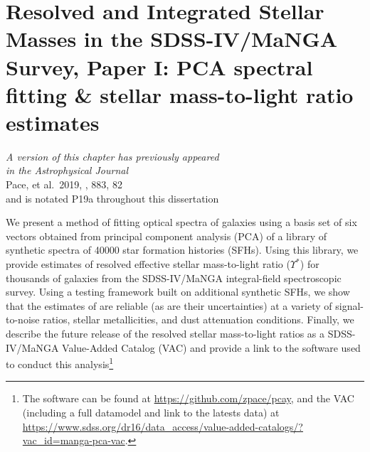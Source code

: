 \chapter[PCA spectral fitting \& stellar mass-to-light ratio estimates]{Resolved and Integrated Stellar Masses in the SDSS-IV/MaNGA Survey, Paper I: PCA spectral fitting \& stellar mass-to-light ratio estimates}
\label{chapter1}

\vfill

\begin{flushright}
    \fixspacing %
    \textit{A version of this chapter has previously appeared\\
        in the \emph{Astrophysical Journal}} \\ \vspace{1ex}
    Pace, et al.\ 2019, \apj, 883, 82 \\ \vspace{1ex}
    and is notated P19a throughout this dissertation
\end{flushright}

\vspace*{1in} %

\cleardoublepage

\begin{chabstract}
We present a method of fitting optical spectra of galaxies using a basis set of six vectors obtained from principal component analysis (PCA) of a library of synthetic spectra of 40000 star formation histories (SFHs). Using this library, we provide estimates of resolved effective stellar mass-to-light ratio ($\Upsilon^*$) for thousands of galaxies from the SDSS-IV/MaNGA integral-field spectroscopic survey. Using a testing framework built on additional synthetic SFHs, we show that the estimates of  are reliable (as are their uncertainties) at a variety of signal-to-noise ratios, stellar metallicities, and dust attenuation conditions. Finally, we describe the future release of the resolved stellar mass-to-light ratios as a SDSS-IV/MaNGA Value-Added Catalog (VAC) and provide a link to the software used to conduct this analysis\footnote{\fixspacing\label{footnote:software_link}The software can be found at \url{https://github.com/zpace/pcay}, and the VAC (including a full datamodel and link to the latests data) at \url{https://www.sdss.org/dr16/data_access/value-added-catalogs/?vac_id=manga-pca-vac}.}
\end{chabstract}
\cleardoublepage

